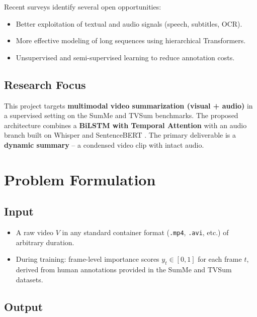 \documentclass[12pt, a4paper]{report}
\begin{document}
Recent surveys \cite{apostolidis2021} identify several open opportunities:
\begin{itemize}[leftmargin=1.5cm]
  \item Better exploitation of textual and audio signals (speech, subtitles, OCR).
  \item More effective modeling of long sequences using hierarchical Transformers.
  \item Unsupervised and semi-supervised learning to reduce annotation costs.
\end{itemize}

\section{Research Focus}

This project targets \textbf{multimodal video summarization (visual + audio)} in a
supervised setting on the SumMe \cite{gygli2014} and TVSum \cite{song2015} benchmarks.
The proposed architecture combines a \textbf{BiLSTM with Temporal Attention}
\cite{zhang2016} with an audio branch built on Whisper \cite{radford2023} and
SentenceBERT \cite{reimers2019}. The primary deliverable is a \textbf{dynamic summary}
-- a condensed video clip with intact audio.

\chapter{Problem Formulation}

\section{Input}

\begin{itemize}[leftmargin=1.5cm]
  \item A raw video $V$ in any standard container format (\texttt{.mp4}, \texttt{.avi},
        etc.) of arbitrary duration.
  \item During training: frame-level importance scores $y_t \in [0,1]$ for each frame
        $t$, derived from human annotations provided in the SumMe and TVSum datasets.
\end{itemize}

\section{Output}
\end{document}
